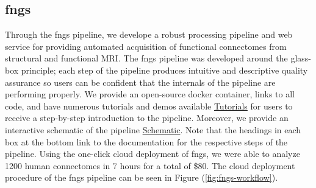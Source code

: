 \documentclass[simplex.tex]{subfiles}
\begin{document}
\subsection{fngs}

Through the fngs pipeline, we develope a robust processing pipeline and web service for providing automated acquisition of functional connectomes from structural and functional MRI. The fngs pipeline was developed around the glass-box principle; each step of the pipeline produces intuitive and descriptive quality assurance so users can be confident that the internals of the pipeline are performing properly. We provide an open-source docker container, links to all code, and have numerous tutorials and demos available \href{https://github.com/neurodatadesign/fngs}{Tutorials} for users to receive a step-by-step introduction to the pipeline. Moreover, we provide an interactive schematic of the pipeline \href{https://neurodatadesign.github.io/fngs/about_fngs/Schematic.html}{Schematic}. Note that the headings in each box at the bottom link to the documentation for the respective steps of the pipeline. Using the one-click cloud deployment of fngs, we were able to analyze 1200 human connectomes in 7 hours for a total of \$80. The cloud deployment procedure of the fngs pipeline can be seen in Figure (\ref{fig:fngs-workflow}).
\end{document}
